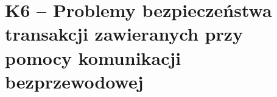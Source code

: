 \section{K6 -- Problemy bezpieczeństwa transakcji zawieranych przy pomocy komunikacji bezprzewodowej}